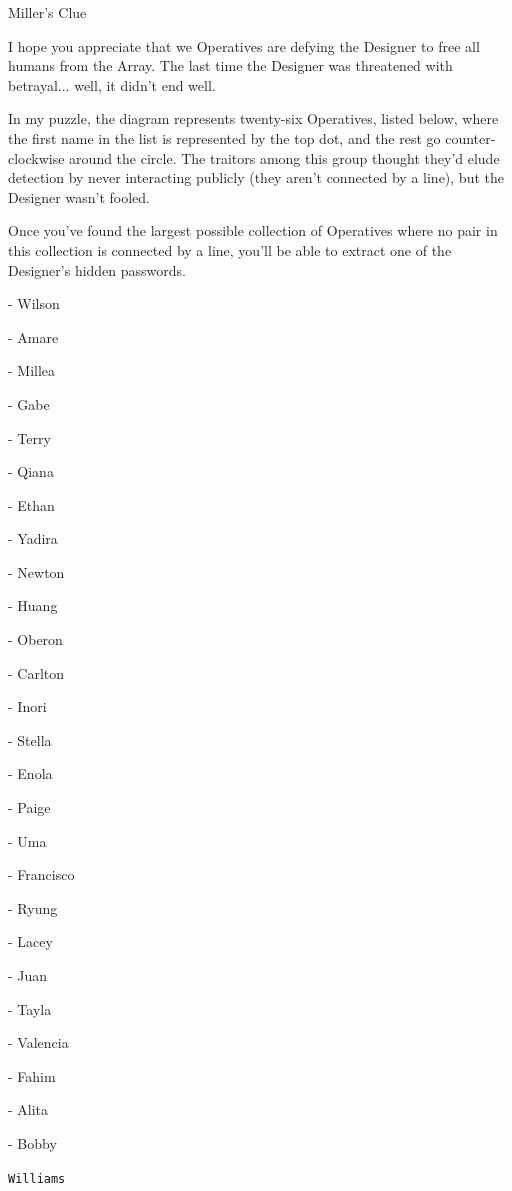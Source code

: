 \documentclass{article}
\newcommand{\clue}[1]{#1}
\newcommand{\puzzleTitle}[1]{
\begin{center}
{\Large \texttt{#1}}
\end{center}
}
\begin{document}
\clue{
Miller's Clue

I hope you appreciate that we Operatives are defying
the Designer to free all humans from the Array. The last
time the Designer was threatened with betrayal... well,
it didn't end well.

In my puzzle, the diagram represents twenty-six Operatives,
listed below, where the first name in the list is represented
by the top dot, and
the rest go counter-clockwise around the circle.
The traitors among this group thought they'd elude detection
by never interacting publicly (they aren't connected by a line),
but the Designer wasn't fooled.

Once you've found the largest possible collection of Operatives where
no pair in this collection is connected by a line, you'll
be able to extract one of the Designer's hidden passwords.


- Wilson

- Amare

- Millea

- Gabe

- Terry

- Qiana

- Ethan

- Yadira

- Newton

- Huang

- Oberon

- Carlton

- Inori

- Stella

- Enola

- Paige

- Uma

- Francisco

- Ryung

- Lacey

- Juan

- Tayla

- Valencia

- Fahim

- Alita

- Bobby
}

\newpage

\puzzleTitle{Williams}

\vfill
\end{document}
